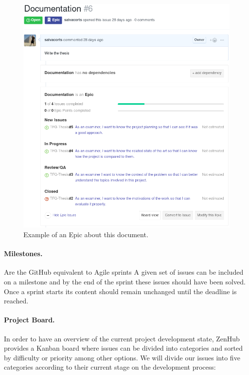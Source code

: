 \begin{figure}[h!]
		\centering
    	\includegraphics[width=\linewidth]{assets/images/epic.png}
    	\caption{Example of an Epic about this document.}
    	\label{fig:epic}
\end{figure}

\paragraph*{Milestones.} Are the GitHub equivalent to Agile sprints A given set of issues can be included on a milestone and by the end of the sprint these issues should have been solved. Once a sprint starts its content should remain unchanged until the deadline is reached.

\paragraph*{Project Board.} In order to have an overview of the current project development state, ZenHub provides a Kanban board \cite{kanban} where issues can be divided into categories and sorted by difficulty or priority among other options. We will divide our issues into five categories according to their current stage on the development process:

